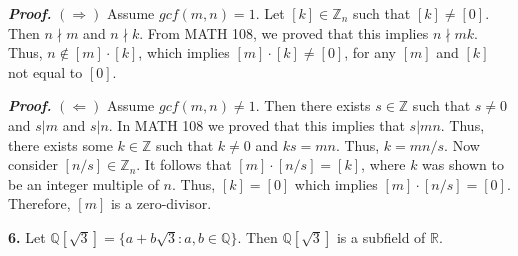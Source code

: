 \documentclass[12pt, a4paper]{article}
\begin{document}
\begin{addmargin}[1.5em]{1.5em}

    \noindent\textbf{\textit{Proof.}} $(\Rightarrow)$ Assume $gcf(m,n)=1$. Let $[k]\in\mathbb{Z}_n$ such that $[k]\neq[0]$. Then $n\nmid m$ and $n\nmid k$. From MATH 108, we proved that this implies $n\nmid mk$. Thus, $n\notin[m]\cdot[k]$, which implies $[m]\cdot[k]\neq[0]$, for any $[m]$ and $[k]$ not equal to $[0]$.
    
    \vspace{4mm}
    
    \noindent\textbf{\textit{Proof.}} $(\Leftarrow)$ Assume $gcf(m,n)\neq 1$. Then there exists $s\in\mathbb{Z}$ such that $s\neq 0$ and $s| m$ and $s| n$. In MATH 108 we proved that this implies that $s| mn$. Thus, there exists some $k\in\mathbb{Z}$ such that $k\neq 0$ and $ks=mn$. Thus, $k=mn/s$. Now consider $[n/s]\in\mathbb{Z}_n$. It follows that $[m]\cdot[n/s]=[k]$, where $k$ was shown to be an integer multiple of $n$. Thus, $[k]=[0]$ which implies $[m]\cdot[n/s]=[0]$. Therefore, $[m]$ is a zero-divisor.\hspace{121.6mm}\square
    

\end{addmargin}

\vspace{6mm}

\newpage

\noindent\textbf{6.} Let $\mathbb{Q}[\sqrt{3}]=\{a+b\sqrt{3}\colon a,b\in\mathbb{Q}\}$. Then $\mathbb{Q}[\sqrt{3}]$ is a subfield of $\mathbb{R}$. 

\vspace{4mm}
\end{document}
